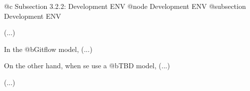@c Subsection 3.2.2: Development ENV
@node Development ENV
@subsection Development ENV

(...)

In the @b{Gitflow} model, (...)

On the other hand, when se use a @b{TBD} model, (...)

(...)
